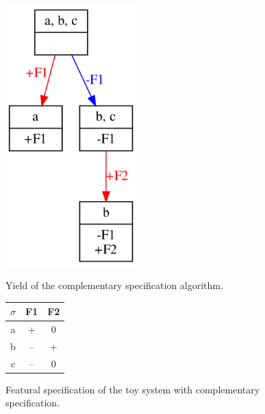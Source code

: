 \documentclass[12pt, oneside]{article}   	%
\begin{document}
\begin{figure}[htb!]
	\centering
	\begin{minipage}{0.45\textwidth}
		\centering
		\includegraphics[width=0.45\textwidth]{toy_system_complementary.png}
		\caption{Yield of the complementary specification algorithm.}
		\label{fig:toy_system_complementary}
	\end{minipage}
	\begin{minipage}{0.45\textwidth}
		\centering
		\captionsetup{type=table} %
	\begin{tabular} {|c||c|c|}
	\hline
	$\sigma$ & F1 & F2 \\ \hline
	a & + & 0 \\
	b & -- & + \\
	c & -- & 0 \\
	\hline
\end{tabular}
\caption{Featural specification of the toy system with complementary specification.}
\label{table:toy_system_complementary}
	\end{minipage}
\end{figure}

%
\end{document}
